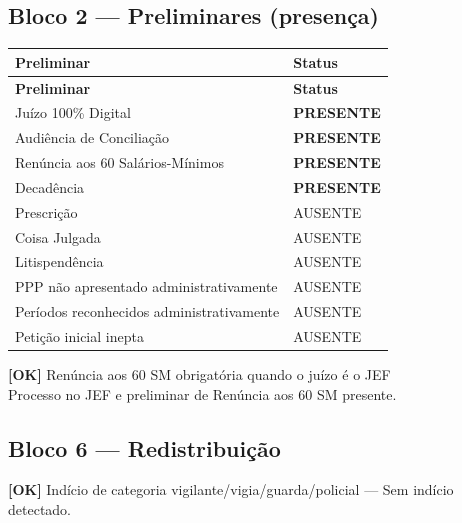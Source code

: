 \documentclass[12pt,a4paper]{article}
\newcommand{\statusOK}[1]{\textcolor{corOK}{\textbf{[OK]}} #1}
\begin{document}
\subsection{Bloco 2 --- Preliminares (presença)}

\begin{longtable}{p{8.5cm} p{4.5cm}}
  \toprule
  \textbf{Preliminar} & \textbf{Status} \\
  \midrule
  \endfirsthead
  \toprule
  \textbf{Preliminar} & \textbf{Status} \\
  \midrule
  \endhead
  Juízo 100\% Digital                           & \textcolor{corOK}{\textbf{PRESENTE}} \\
  Audiência de Conciliação                      & \textcolor{corOK}{\textbf{PRESENTE}} \\
  Renúncia aos 60 Salários-Mínimos              & \textcolor{corOK}{\textbf{PRESENTE}} \\
  Decadência                                    & \textcolor{corOK}{\textbf{PRESENTE}} \\
  Prescrição                                    & AUSENTE \\
  Coisa Julgada                                 & AUSENTE \\
  Litispendência                                & AUSENTE \\
  PPP não apresentado administrativamente       & AUSENTE \\
  Períodos reconhecidos administrativamente     & AUSENTE \\
  Petição inicial inepta                        & AUSENTE \\
  \bottomrule
\end{longtable}

\statusOK{Renúncia aos 60 SM obrigatória quando o juízo é o JEF}\\
Processo no JEF e preliminar de Renúncia aos 60 SM presente.

\subsection{Bloco 6 --- Redistribuição}

\statusOK{Indício de categoria vigilante/vigia/guarda/policial} --- Sem indício detectado.
\end{document}
